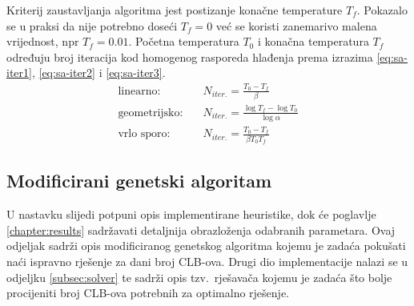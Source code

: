 \documentclass[times, utf8, diplomski]{fer}
\begin{document}
Kriterij zaustavljanja algoritma jest postizanje konačne temperature $T_{f}$. Pokazalo se u praksi da nije potrebno doseći $T_{f}=0$ već se koristi zanemarivo malena vrijednost, npr $T_{f}=0.01$. Početna temperatura $T_{0}$ i konačna temperatura $T_{f}$ određuju broj iteracija kod homogenog rasporeda hlađenja prema izrazima \ref{eq:sa-iter1}, \ref{eq:sa-iter2} i \ref{eq:sa-iter3}.
%
\begin{align}
	\label{eq:sa-iter1}
	\text{linearno:} \quad & N_{iter.} = \frac{T_{0} - T_{f}}{\beta} \\
	\label{eq:sa-iter2}
	\text{geometrijsko:} \quad & N_{iter.} = \frac{\log T_{f} - \log T_{0}}{\log \alpha} \\
	\label{eq:sa-iter3}
	\text{vrlo sporo:} \quad & N_{iter.} = \frac{T_{0} - T_{f}}{\beta T_{0} T_{f}}
\end{align}

\subsection{Modificirani genetski algoritam} \label{subsec:implementation}

U nastavku slijedi potpuni opis implementirane heuristike, dok će poglavlje \ref{chapter:results} sadržavati detaljnija obrazloženja odabranih parametara. Ovaj odjeljak sadrži opis modificiranog genetskog algoritma kojemu je zadaća pokušati naći ispravno rješenje za dani broj CLB-ova. Drugi dio implementacije nalazi se u odjeljku \ref{subsec:solver} te sadrži opis tzv.~rješavača kojemu je zadaća što bolje procijeniti broj CLB-ova potrebnih za optimalno rješenje.
\end{document}
